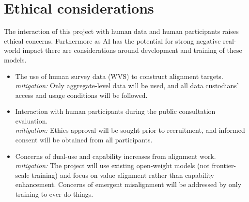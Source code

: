 \section{Ethical considerations}

The interaction of this project with human data and human participants raises ethical concerns. Furthermore as AI has the potential for strong negative real-world impact there are considerations around development and training of these models.

\begin{itemize}
  \item The use of human survey data (WVS) to construct alignment targets. \\
  \textit{mitigation:} Only aggregate-level data will be used, and all data custodians' access and usage conditions will be followed.
  \item Interaction with human participants during the public consultation evaluation.\\
  \textit{mitigation:} Ethics approval will be sought prior to recruitment, and informed consent will be obtained from all participants.
  \item Concerns of dual-use and capability increases from alignment work. \\
  \textit{mitigation:} The project will use existing open-weight models (not frontier-scale training) and focus on value alignment rather than capability enhancement. Concerns of emergent misalignment will be addressed by only training to ever do  things.
\end{itemize}